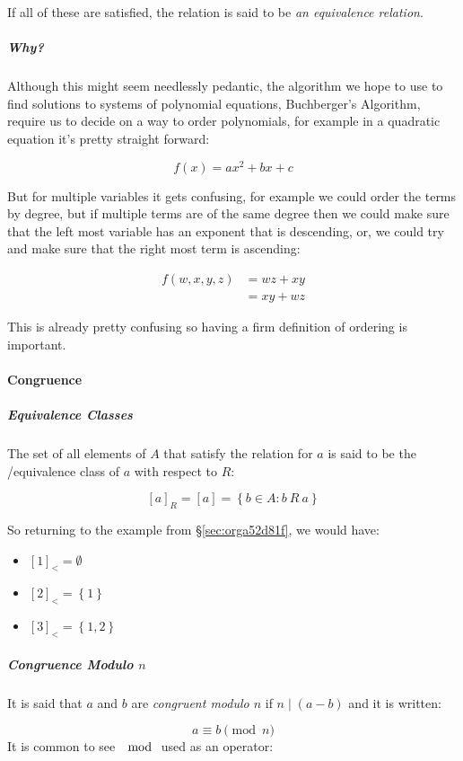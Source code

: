 \documentclass[a4paper,11pt,twoside]{article}
\begin{document}
If all of these are satisfied, the relation is said to be \emph{an
equivalence relation}.

\subparagraph{Why?}
\label{sec:org8b897fd}
Although this might seem needlessly pedantic, the algorithm we
hope to use to find solutions to systems of polynomial
equations, Buchberger's Algorithm, require us to decide on a
way to order polynomials, for example in a quadratic equation
it's pretty straight forward:

\[
      f(x) = ax^2 + bx +c
      \]

But for multiple variables it gets confusing, for example we could
order the terms by degree, but if multiple terms are of the same
degree then we could make sure that the left most variable has an
exponent that is descending, or, we could try and make sure that
the right most term is ascending:

\begin{align}
 f\left(w,x,y,z\right)	&=wz+xy \\
			 &=xy+wz
\end{align}

This is already pretty confusing so having a firm definition of
ordering is important.

\paragraph{Congruence}
\label{sec:org613b72d}
\subparagraph{Equivalence Classes}
\label{sec:orge6d7a52}
The set of all elements of \(A\) that satisfy the relation for
\(a\) is said to be the /equivalence class of \(a\) with respect to \(R\):

\[\left\lbrack a \right\rbrack_{R} = \left\lbrack a \right\rbrack = \left\{ b \in A:b\ R\ a \right\}\]

So returning to the example from \S \ref{sec:orga52d81f}, we would have:

\begin{itemize}
\item \([1]_<=\emptyset\)
\item \([2]_<=\left\{1\right\}\)
\item \([3]_<=\left\{1, 2\right\}\)
\end{itemize}
\subparagraph{Congruence Modulo \(n\)}
\label{sec:org8e95ae6}
It is said that \(a\) and \(b\) are \emph{congruent modulo \(n\)} if
\(n\mid \left(a-b\right)\) and it is written:

\[
      a\equiv b \pmod{n}
      \]
It is common to see \(\mod\) used as an operator:
\end{document}
